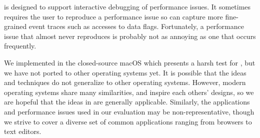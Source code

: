 \xxx is designed to support interactive debugging of performance issues. It
sometimes requires the user to reproduce a performance issue so \xxx can capture
more fine-grained event traces such as accesses to data flags. Fortunately, a
performance issue that almost never reproduces is probably not as annoying as
one that occurs frequently.

We implemented \xxx in the closed-source macOS which presents a harsh test
for \xxx, but we have not ported \xxx to other operating systems yet. It is
possible that the ideas and techniques do not generalize to other operating
systems. However, modern operating systems share many similarities, and inspire
each others' designs, so we are hopeful that the ideas in \xxx are generally applicable.
Similarly, the applications and performance issues used in our
evaluation may be non-representative, though we strive to cover a diverse set of
common applications ranging from browsers to text editors.

